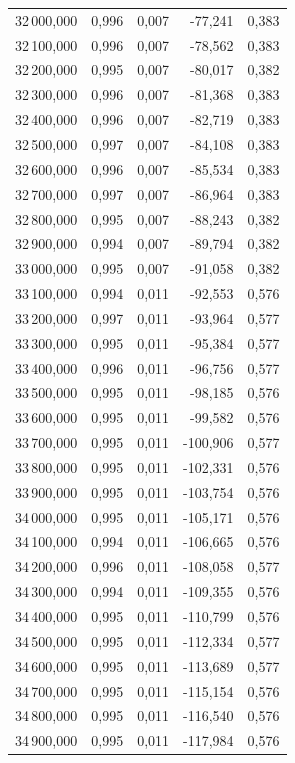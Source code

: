 \begin{longtable}{rrrrr}
32\,000,000 & 0,996 & 0,007 & -77,241 & 0,383\\
32\,100,000 & 0,996 & 0,007 & -78,562 & 0,383\\
32\,200,000 & 0,995 & 0,007 & -80,017 & 0,382\\
32\,300,000 & 0,996 & 0,007 & -81,368 & 0,383\\
32\,400,000 & 0,996 & 0,007 & -82,719 & 0,383\\
32\,500,000 & 0,997 & 0,007 & -84,108 & 0,383\\
32\,600,000 & 0,996 & 0,007 & -85,534 & 0,383\\
32\,700,000 & 0,997 & 0,007 & -86,964 & 0,383\\
32\,800,000 & 0,995 & 0,007 & -88,243 & 0,382\\
32\,900,000 & 0,994 & 0,007 & -89,794 & 0,382\\
33\,000,000 & 0,995 & 0,007 & -91,058 & 0,382\\
33\,100,000 & 0,994 & 0,011 & -92,553 & 0,576\\
33\,200,000 & 0,997 & 0,011 & -93,964 & 0,577\\
33\,300,000 & 0,995 & 0,011 & -95,384 & 0,577\\
33\,400,000 & 0,996 & 0,011 & -96,756 & 0,577\\
33\,500,000 & 0,995 & 0,011 & -98,185 & 0,576\\
33\,600,000 & 0,995 & 0,011 & -99,582 & 0,576\\
33\,700,000 & 0,995 & 0,011 & -100,906 & 0,577\\
33\,800,000 & 0,995 & 0,011 & -102,331 & 0,576\\
33\,900,000 & 0,995 & 0,011 & -103,754 & 0,576\\
34\,000,000 & 0,995 & 0,011 & -105,171 & 0,576\\
34\,100,000 & 0,994 & 0,011 & -106,665 & 0,576\\
34\,200,000 & 0,996 & 0,011 & -108,058 & 0,577\\
34\,300,000 & 0,994 & 0,011 & -109,355 & 0,576\\
34\,400,000 & 0,995 & 0,011 & -110,799 & 0,576\\
34\,500,000 & 0,995 & 0,011 & -112,334 & 0,577\\
34\,600,000 & 0,995 & 0,011 & -113,689 & 0,577\\
34\,700,000 & 0,995 & 0,011 & -115,154 & 0,576\\
34\,800,000 & 0,995 & 0,011 & -116,540 & 0,576\\
34\,900,000 & 0,995 & 0,011 & -117,984 & 0,576\\

\end{longtable}
